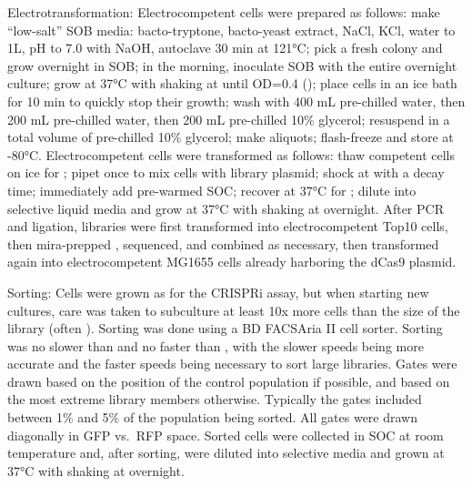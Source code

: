 \documentclass[10pt,oneside]{article}
\begin{document}
Electrotransformation: Electrocompetent cells were prepared as follows: make ``low-salt'' SOB media:  bacto-tryptone,  bacto-yeast extract,   NaCl,   KCl, water to 1L, pH to 7.0 with NaOH, autoclave 30 min at 121°C; pick a fresh colony and grow overnight in  SOB; in the morning, inoculate  SOB with the entire overnight culture; grow at 37°C with shaking at  until OD=0.4 (); place cells in an ice bath for 10 min to quickly stop their growth; wash with 400 mL pre-chilled water, then 200 mL pre-chilled water, then 200 mL pre-chilled 10\% glycerol; resuspend in a total volume of  pre-chilled 10\% glycerol; make  aliquots; flash-freeze and store at -80°C.  Electrocompetent cells were transformed as follows: thaw competent cells on ice for ; pipet once to mix cells with   library plasmid; shock at  with a  decay time; immediately add  pre-warmed SOC; recover at 37°C for ; dilute into selective liquid media and grow at 37°C with shaking at  overnight.  After PCR and ligation, libraries were first transformed into electrocompetent Top10 cells, then mira-prepped \autocite{pronobis2016}, sequenced, and combined as necessary, then transformed again into electrocompetent MG1655 cells already harboring the dCas9 plasmid.

Sorting: Cells were grown as for the CRISPRi assay, but when starting new  cultures, care was taken to subculture at least 10x more cells than the size of the library (often ).  Sorting was done using a BD FACSAria II cell sorter.  Sorting was no slower than  and no faster than , with the slower speeds being more accurate and the faster speeds being necessary to sort large libraries.  Gates were drawn based on the position of the control population if possible, and based on the most extreme library members otherwise.  Typically the gates included between 1\% and 5\% of the population being sorted.  All gates were drawn diagonally in GFP vs.\ RFP space.  Sorted cells were collected in  SOC at room temperature and, after sorting, were diluted into selective media and grown at 37°C with shaking at  overnight.
\end{document}
